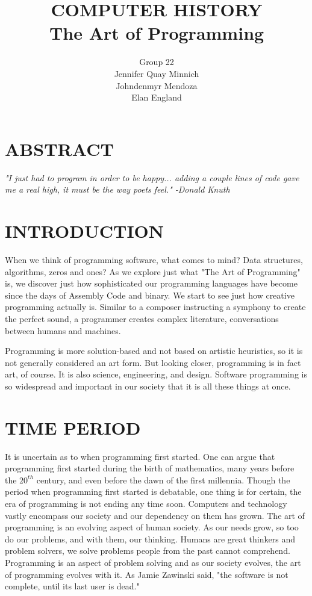 \documentclass[letterpaper, 10 pt, conference]{IEEEconf}
\title{\LARGE \bf
COMPUTER HISTORY\\
\large The Art of Programming
}
\author{Group 22\\
\small Jennifer Quay Minnich\\
\small Johndenmyr Mendoza\\
\small Elan England\\
}
\begin{document}
\maketitle
\thispagestyle{empty}
\pagestyle{empty}


\section*{ABSTRACT}
\textit{
"I just had to program in order to be happy... 
adding a couple lines of code gave me a real high, 
it must be the way poets feel." 
-Donald Knuth
}

\section{INTRODUCTION}

When we think of programming software, what comes to mind?  Data structures, 
algorithms, zeros and ones? As we explore just what "The Art of Programming" is,
we discover just how sophisticated our programming languages have become 
since the days of Assembly Code and binary. We start to see just how creative
programming actually is. Similar to a composer instructing a symphony to create
the perfect sound, a programmer creates complex literature, conversations between 
humans and machines.

Programming is more solution-based and not based on artistic heuristics, so it is 
not generally considered an art form. But looking closer, programming is in fact art,
of course. It is also science, engineering, and design. Software programming is so 
widespread and important in our society that it is all these things at once.

\section{TIME PERIOD}

It is uncertain as to when programming first started. 
One can argue that programming first started during the birth of mathematics, many years before the $20^{th}$ century, and even before the dawn of the first millennia.
 Though the period when programming first started is debatable, one thing is for certain, the era of programming is not ending any time soon.
  Computers and technology vastly encompass our society and our dependency on them has grown.
   The art of programming is an evolving aspect of human society. 
   As our needs grow, so too do our problems, and with them, our thinking. 
   Humans are great thinkers and problem solvers, we solve problems people from the past cannot comprehend. 
   Programming is an aspect of problem solving and as our society evolves, the art of programming evolves with it. 
   As Jamie Zawinski said, "the software is not complete, until its last user is dead."
\end{document}
